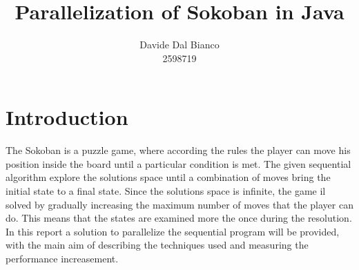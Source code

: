 \documentclass{article}
\title{Parallelization of Sokoban in Java}
\author{Davide Dal Bianco \\ 2598719}
\begin{document}
\maketitle

\section{Introduction}
The Sokoban is a puzzle game, where according the rules the player can move his position inside the board until a particular condition is met. The given sequential algorithm explore the solutions space until a combination of moves bring the initial state to a final state. Since the solutions space is infinite, the game il solved by gradually increasing the maximum number of moves that the player can do. This means that the states are examined more the once during the resolution. In this report a solution to parallelize the sequential program will be provided, with the main aim of describing the techniques used and measuring the performance increasement.
\end{document}
